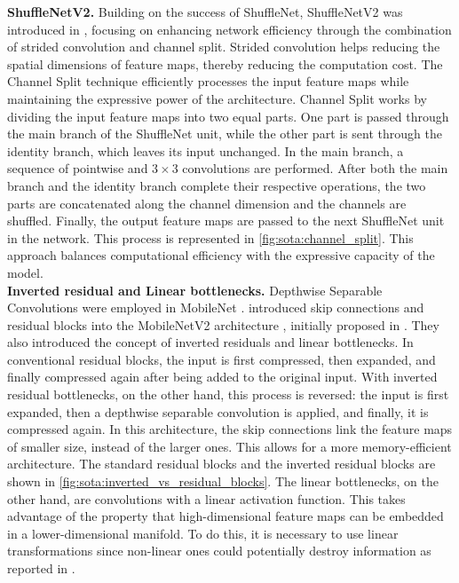 \noindent\textbf{ShuffleNetV2.} Building on the success of ShuffleNet,
ShuffleNetV2 was introduced in \cite{MaShuffleNetV2}, focusing on enhancing
network efficiency through the combination of strided convolution and channel
split. Strided convolution helps reducing the spatial dimensions of feature
maps, thereby reducing the computation cost. The Channel Split technique
efficiently processes the input feature maps while maintaining the expressive
power of the architecture. Channel Split works by dividing the input feature
maps into two equal parts. One part is passed through the main branch of the
ShuffleNet unit, while the other part is sent through the identity branch, which
leaves its input unchanged. In the main branch, a sequence of pointwise and
$3\times 3$ convolutions are performed. After both the main branch and the
identity branch complete their respective operations, the two parts are
concatenated along the channel dimension and the channels are shuffled. Finally,
the output feature maps are passed to the next ShuffleNet unit in the network.
This process is represented in \cref{fig:sota:channel_split}. This approach
balances computational efficiency with the expressive capacity of the model.\\

\noindent\textbf{Inverted residual and Linear bottlenecks.} Depthwise Separable
Convolutions were employed in MobileNet \cite{howard2017mobilenets}.
\citeauthor{DBLP:conf/cvpr/SandlerHZZC18} introduced skip connections and
residual blocks into the MobileNetV2 architecture
\cite{DBLP:conf/cvpr/SandlerHZZC18}, initially proposed in
\cite{DBLP:conf/cvpr/HeZRS16}. They also introduced the concept of inverted
residuals and linear bottlenecks. In conventional residual blocks, the input is
first compressed, then expanded, and finally compressed again after being added
to the original input. With inverted residual bottlenecks, on the other hand,
this process is reversed: the input is first expanded, then a depthwise
separable convolution is applied, and finally, it is compressed again. In this
architecture, the skip connections link the feature maps of smaller size,
instead of the larger ones. This allows for a more memory-efficient
architecture. The standard residual blocks and the inverted residual blocks are
shown in \cref{fig:sota:inverted_vs_residual_blocks}. The linear bottlenecks, on
the other hand, are convolutions with a linear activation function. This takes
advantage of the property that high-dimensional feature maps can be embedded in
a lower-dimensional manifold. To do this, it is necessary to use linear
transformations since non-linear ones could potentially destroy information as
reported in \cite{DBLP:conf/cvpr/SandlerHZZC18,DBLP:conf/cvpr/HanKK17}.\\

